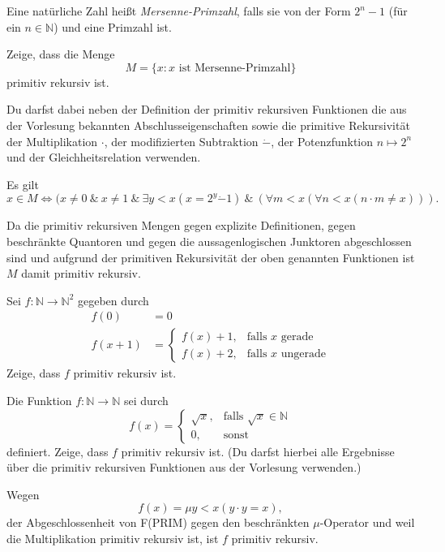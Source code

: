 \documentclass[german,headsepline]{scrartcl}
\theoremstyle{definition}
\begin{document}
	\begin{question}[subtitle={Nachklausur 2013}]
		Eine natürliche Zahl heißt \emph{Mersenne-Primzahl}, falls sie von der Form $2^n-1$ (für ein $n\in\mathbb{N}$) und eine Primzahl ist.
		
		Zeige, dass die Menge
		\[M=\{x\colon x\text{ ist Mersenne-Primzahl}\}\]
		primitiv rekursiv ist.
		
		Du darfst dabei neben der Definition der primitiv rekursiven Funktionen die aus der Vorlesung bekannten Abschlusseigenschaften sowie die primitive Rekursivität der Multiplikation $\cdot$, der modifizierten Subtraktion $\dot{-}$, der Potenzfunktion $n\mapsto2^n$ und der Gleichheitsrelation verwenden.
	\end{question}
	\begin{solution}
		Es gilt
		\[x\in M\Leftrightarrow(x\neq0~\&~x\neq1~\&~\exists y<x(x=2^y\dot{-}1)~\&~(\forall m<x(\forall n<x(n\cdot m\neq x))).\]
		
		Da die primitiv rekursiven Mengen gegen explizite Definitionen,
		gegen beschränkte Quantoren und gegen die aussagenlogischen Junktoren abgeschlossen sind
		und aufgrund der primitiven Rekursivität der oben genannten Funktionen
		ist $M$ damit primitiv rekursiv.
	\end{solution}
	
	\begin{question}[subtitle={Blatt 13, 2015}]
		Sei $f:\mathbb{N}\to\mathbb{N}^2$ gegeben durch
		\begin{align*}
			f(0) &= 0 \\
			f(x+1) &= \begin{cases}
				f(x)+1, &\text{falls $x$ gerade} \\
				f(x)+2, &\text{falls $x$ ungerade}
			\end{cases}
		\end{align*}
		Zeige, dass $f$ primitiv rekursiv ist.
	\end{question}
	
	\begin{question}[subtitle={Klausur 2009}]
		Die Funktion $f:\mathbb{N}\to\mathbb{N}$ sei durch
		\[f(x)=\begin{cases}
			\sqrt{x}, &\text{falls }\sqrt{x}\in\mathbb{N} \\
			0, &\text{sonst}
		\end{cases}\]
		definiert. Zeige, dass $f$ primitiv rekursiv ist.
		(Du darfst hierbei alle Ergebnisse über die primitiv rekursiven Funktionen aus der Vorlesung verwenden.)
	\end{question}
	\begin{solution}
		Wegen
		\[f(x)=\mu y<x(y\cdot y=x),\]
		der Abgeschlossenheit von F(PRIM) gegen den beschränkten $\mu$-Operator
		und weil die Multiplikation primitiv rekursiv ist,
		ist $f$ primitiv rekursiv.
	\end{solution}
	
\end{document}
